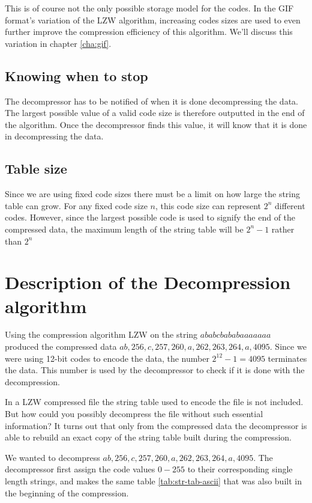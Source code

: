 This is of course not the only possible storage model for the
codes. In the GIF format's variation of the LZW algorithm, increasing
codes sizes are used to even further improve the compression
efficiency of this algorithm. We'll discuss this variation in chapter
\ref{cha:gif}.

\subsection{Knowing when to stop}

The decompressor has to be notified of when it is done decompressing
the data. The largest possible value of a valid code size is therefore
outputted in the end of the algorithm. Once the decompressor finds
this value, it will know that it is done in decompressing the data.

\subsection{Table size}

Since we are using fixed code sizes there must be a limit on how large
the string table can grow. For any fixed code size $n$, this code size
can represent $2^n$ different codes. However, since the largest
possible code is used to signify the end of the compressed data, the
maximum length of the string table will be $2^n - 1$ rather than $2^n$

\section{Description of the Decompression algorithm}

Using the compression algorithm LZW on the string $ababcbababaaaaaaa$
produced the compressed data $ab, 256,c, 257, 260, a, 262, 263, 264,
a,4095$. Since we were using 12-bit codes to encode the data, the
number $2^{12} - 1 = 4095$ terminates the data. This number is used by
the decompressor to check if it is done with the decompression.

In a LZW compressed file the string table used to encode the file is
not included. But how could you possibly decompress the file without
such essential information? It turns out that only from the compressed
data the decompressor is able to rebuild an exact copy of the string
table built during the compression.

We wanted to decompress $ab, 256,c, 257, 260, a, 262, 263, 264,
a,4095$. The decompressor first assign the code values $0-255$ to
their corresponding single length strings, and makes the same table
\ref{tab:str-tab-ascii} that was also built in the beginning of the
compression.

